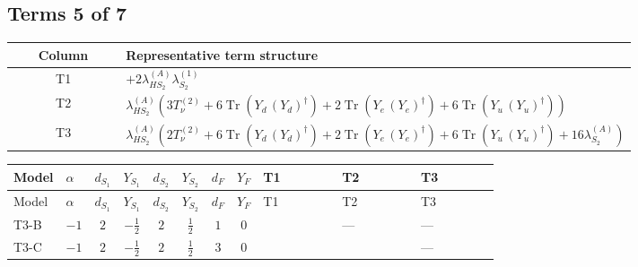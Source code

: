 \documentclass[8pt]{article}
\begin{document}
\begin{landscape}
\subsection*{Terms 5 of 7}
\begin{center}
\begin{tabular}{@{}c >{\raggedright\arraybackslash}p{0.82\linewidth}@{}}
\toprule
Column & Representative term structure \\
\midrule
T1 & \(\displaystyle +2 {\lambda_{HS_2}^{(A)}} {\lambda_{S_2}^{(1)}}\) \\
\midrule
T2 & \(\displaystyle {\lambda_{HS_2}^{(A)}} (3 T_{\nu}^{(2)}+6 \operatorname{Tr}\!\left({Y_d}\,\left({Y_d}\right)^{\dagger}\right)+2 \operatorname{Tr}\!\left({Y_e}\,\left({Y_e}\right)^{\dagger}\right)+6 \operatorname{Tr}\!\left({Y_u}\,\left({Y_u}\right)^{\dagger}\right))\) \\
\midrule
T3 & \(\displaystyle {\lambda_{HS_2}^{(A)}} (2 T_{\nu}^{(2)}+6 \operatorname{Tr}\!\left({Y_d}\,\left({Y_d}\right)^{\dagger}\right)+2 \operatorname{Tr}\!\left({Y_e}\,\left({Y_e}\right)^{\dagger}\right)+6 \operatorname{Tr}\!\left({Y_u}\,\left({Y_u}\right)^{\dagger}\right)+16 {\lambda_{S_2}^{(A)}})\) \\
\midrule
\bottomrule
\end{tabular}
\end{center}
\smallskip
\tiny
\begin{longtable}{@{}llcccccc >{\raggedright\arraybackslash}p{0.21\linewidth} >{\raggedright\arraybackslash}p{0.21\linewidth} >{\raggedright\arraybackslash}p{0.21\linewidth}@{}}
\toprule
Model & $\alpha$ & $d_{S_1}$ & $Y_{S_1}$ & $d_{S_2}$ & $Y_{S_2}$ & $d_F$ & $Y_F$ & T1 & T2 & T3 \\
\midrule
\endfirsthead
\toprule
Model & $\alpha$ & $d_{S_1}$ & $Y_{S_1}$ & $d_{S_2}$ & $Y_{S_2}$ & $d_F$ & $Y_F$ & T1 & T2 & T3 \\
\midrule
\endhead
T3-B & $-1$ & $2$ & $-\frac{1}{2}$ & $2$ & $\frac{1}{2}$ & $1$ & $0$ & \scriptsize\adjustbox{max width=\linewidth}{$\begin{gathered} +2 {\lambda_{HS_2}^{(A)}} {\lambda_{S_2}^{(1)}}\end{gathered}$} & --- & --- \\
\midrule
T3-C & $-1$ & $2$ & $-\frac{1}{2}$ & $2$ & $\frac{1}{2}$ & $3$ & $0$ & \scriptsize\adjustbox{max width=\linewidth}{$\begin{gathered} +2 {\lambda_{HS_2}^{(A)}} {\lambda_{S_2}^{(1)}}\end{gathered}$} & \scriptsize\adjustbox{max width=\linewidth}{$\begin{gathered} {\lambda_{HS_2}^{(A)}} (3 T_{\nu}^{(2)}+6 \operatorname{Tr}\!\left({Y_d}\,\left({Y_d}\right)^{\dagger}\right)+2 \operatorname{Tr}\!\left({Y_e}\,\left({Y_e}\right)^{\dagger}\right)+6 \operatorname{Tr}\!\left({Y_u}\,\left({Y_u}\right)^{\dagger}\right))\end{gathered}$} & --- \\

\end{longtable}
\end{landscape}
\end{document}
